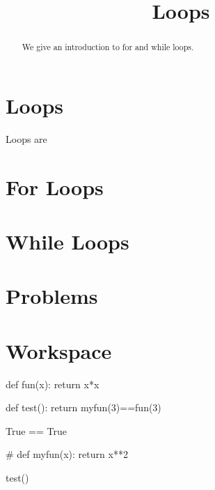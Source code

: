 \documentclass{ximera}
\title{Loops}
\begin{document}
  
\begin{abstract}  
We give an introduction to for and while loops.
\end{abstract}  
\maketitle

\section{Loops}

Loops are 

\section{For Loops}

\section{While Loops}

\section{Problems}

\begin{question}
\end{question}

\begin{question}
\end{question}

\section{Workspace}

\begin{expandable}
\begin{sageOutput}
def fun(x):
        return x*x

def test():
        return myfun(3)==fun(3)


True == True
\end{sageOutput}
\end{expandable}

\begin{sageCell}
#
def myfun(x):
        return x**2

test()
\end{sageCell}
\end{document}
